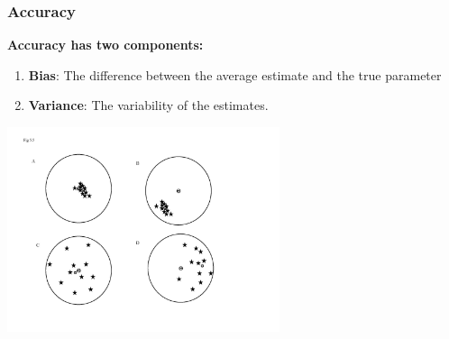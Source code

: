 \documentclass[color=usenames,dvipsnames]{beamer}\usepackage[]{graphicx}\usepackage[]{color}
\begin{document}






\begin{frame}
  \frametitle{Accuracy}
  {\bf \large Accuracy has two components: \par}
  \begin{enumerate}[\bf (1)]
    \normalsize
    \item {\bf Bias}: The difference between the average estimate and
      the true parameter \par
    \item {\bf Variance}: The variability of the estimates.
  \end{enumerate}
  \pause
  \begin{center}
    \includegraphics[width=0.6\textwidth]{figs/bulls-eye.jpg}
  \end{center}
\end{frame}
\end{document}
